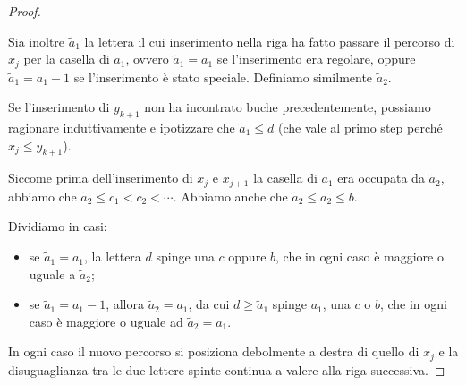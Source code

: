 \begin{proof}
\begin{center}
    \end{center}
    Sia inoltre $\tilde{a}_1$ la lettera il cui inserimento nella riga ha fatto
    passare il percorso di $x_j$ per la casella di $a_1$, ovvero $\tilde{a}_1 = a_1$
    se l'inserimento era regolare, oppure $\tilde{a}_1 = a_1 -1$ se l'inserimento
    \`e stato speciale.
    Definiamo similmente $\tilde{a}_2$.

    Se l'inserimento di $y_{k+1}$ non ha incontrato buche precedentemente, possiamo
    ragionare induttivamente e ipotizzare che $\tilde{a}_1 \leq d $ (che vale al primo
    step perch\'e $x_j \leq y_{k+1}$).

    Siccome prima dell'inserimento di $x_j$ e $x_{j+1}$ la casella di
    $a_1$ era occupata da $\tilde{a}_2$, abbiamo che 
    $\tilde{a}_2 \leq c_1 < c_2 < \cdots$.
    Abbiamo anche che $\tilde{a}_2 \leq a_2 \leq b$.

    Dividiamo in casi:
    \begin{itemize}
        \item se $\tilde{a}_1 = a_1$, la lettera $d$ spinge una $c$ oppure $b$,
            che in ogni caso \`e maggiore o uguale a $\tilde{a}_2$;
        \item se $\tilde{a}_1 = a_1 -1$, allora $\tilde{a}_2 = a_1$, da cui 
            $d \geq \tilde{a}_1$ spinge $a_1$, una $c$ o $b$, che in ogni caso \`e maggiore o uguale
            ad $\tilde{a}_2 = a_1$.
    \end{itemize}

    In ogni caso il nuovo percorso si posiziona debolmente a destra di quello di $x_j$
    e la disuguaglianza tra le due lettere spinte continua a valere alla riga successiva.
    

\end{proof}

